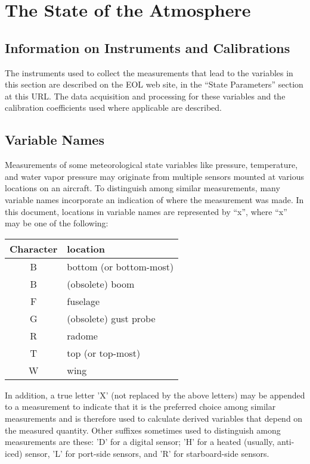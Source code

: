 \documentclass[
]{book}
\begin{document}
\hypertarget{the-state-of-the-atmosphere}{%
\chapter{The State of the Atmosphere}\label{the-state-of-the-atmosphere}}

\hypertarget{information-on-instruments-and-calibrations}{%
\section{Information on Instruments and Calibrations}\label{information-on-instruments-and-calibrations}}

The instruments used to collect the measurements that lead to the variables in this section are described on the EOL web site, in the ``State Parameters'' section at this URL. The data acquisition and processing for these variables and the calibration coefficients used where applicable are described.

\hypertarget{variable-names}{%
\section{Variable Names}\label{variable-names}}

Measurements of some meteorological state variables like pressure, temperature, and water vapor pressure may originate from multiple sensors mounted at various locations on an aircraft. To distinguish among similar measurements, many variable names incorporate an indication of where the measurement was made. In this document, locations in variable names are represented by ``x'', where ``x'' may be one of the following:

\begin{table}
\centering
\begin{tabular}{c|l}
\hline
Character & location\\
\hline
B & bottom (or bottom-most)\\
\hline
B & (obsolete) boom\\
\hline
F & fuselage\\
\hline
G & (obsolete) gust probe\\
\hline
R & radome\\
\hline
T & top (or top-most)\\
\hline
W & wing\\
\hline
\end{tabular}
\end{table}

In addition, a true letter 'X' (not replaced by the above letters) may be appended to a measurement to indicate that it is the preferred choice among similar measurements and is therefore used to calculate derived variables that depend on the measured quantity. Other suffixes sometimes used to distinguish among measurements are these: 'D' for a digital sensor; 'H' for a heated (usually, anti-iced) sensor, 'L' for port-side sensors, and 'R' for starboard-side sensors.
\end{document}
